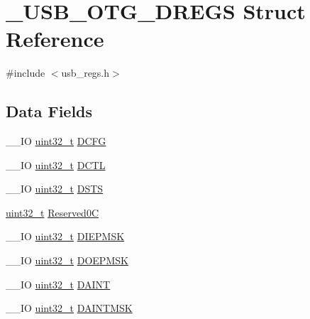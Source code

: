 \hypertarget{struct___u_s_b___o_t_g___d_r_e_g_s}{\section{\-\_\-\-U\-S\-B\-\_\-\-O\-T\-G\-\_\-\-D\-R\-E\-G\-S Struct Reference}
\label{struct___u_s_b___o_t_g___d_r_e_g_s}
}


{\ttfamily \#include $<$usb\-\_\-regs.\-h$>$}

\subsection*{Data Fields}
\begin{DoxyCompactItemize}
\item 
\-\_\-\-\_\-\-I\-O \hyperlink{stdint_8h_a435d1572bf3f880d55459d9805097f62}{uint32\-\_\-t} \hyperlink{group___u_s_b___o_t_g___d_r_i_v_e_r_ga330a64c75ae5e724ad919d92fb338100}{D\-C\-F\-G}
\item 
\-\_\-\-\_\-\-I\-O \hyperlink{stdint_8h_a435d1572bf3f880d55459d9805097f62}{uint32\-\_\-t} \hyperlink{group___u_s_b___o_t_g___d_r_i_v_e_r_ga03802e91c803d405c5c638bac352843d}{D\-C\-T\-L}
\item 
\-\_\-\-\_\-\-I\-O \hyperlink{stdint_8h_a435d1572bf3f880d55459d9805097f62}{uint32\-\_\-t} \hyperlink{group___u_s_b___o_t_g___d_r_i_v_e_r_gab3b0f0e7ce31a08207236f244f9d4873}{D\-S\-T\-S}
\item 
\hyperlink{stdint_8h_a435d1572bf3f880d55459d9805097f62}{uint32\-\_\-t} \hyperlink{group___u_s_b___o_t_g___d_r_i_v_e_r_ga961b96a4163073c4f0959d45496863a9}{Reserved0\-C}
\item 
\-\_\-\-\_\-\-I\-O \hyperlink{stdint_8h_a435d1572bf3f880d55459d9805097f62}{uint32\-\_\-t} \hyperlink{group___u_s_b___o_t_g___d_r_i_v_e_r_ga762132384dd834686a1b445129b31ead}{D\-I\-E\-P\-M\-S\-K}
\item 
\-\_\-\-\_\-\-I\-O \hyperlink{stdint_8h_a435d1572bf3f880d55459d9805097f62}{uint32\-\_\-t} \hyperlink{group___u_s_b___o_t_g___d_r_i_v_e_r_ga264367119e4ee34d16a59408031d7303}{D\-O\-E\-P\-M\-S\-K}
\item 
\-\_\-\-\_\-\-I\-O \hyperlink{stdint_8h_a435d1572bf3f880d55459d9805097f62}{uint32\-\_\-t} \hyperlink{group___u_s_b___o_t_g___d_r_i_v_e_r_gab6955618198becc31d1621906c42389c}{D\-A\-I\-N\-T}
\item 
\-\_\-\-\_\-\-I\-O \hyperlink{stdint_8h_a435d1572bf3f880d55459d9805097f62}{uint32\-\_\-t} \hyperlink{group___u_s_b___o_t_g___d_r_i_v_e_r_gaea0f7408d7142abdd751cd825b350a4f}{D\-A\-I\-N\-T\-M\-S\-K}

\end{DoxyCompactItemize}
